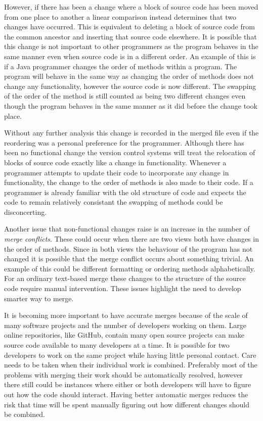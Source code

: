 However, if there has been a change where a block of source code has been moved from one place to another a linear comparison instead determines that two changes have occurred.  This is equivalent to deleting a block of source code from the common ancestor and inserting that source code elsewhere. It is possible that this change is not important to other programmers as the program behaves in the same manner even when source code is in a different order.  An example of this is if a Java programmer changes the order of methods within a program.  The program will behave in the same way as changing the order of methods does not change any functionality, however the source code is now different. The swapping of the order of the method is still counted as being two different changes even though the program behaves in the same manner as it did before the change took place.

Without any further analysis this change is recorded in the merged file even if the reordering was a personal preference for the programmer.  Although there has been no functional change the version control systems will treat the relocation of blocks of source code exactly like a change in functionality.  Whenever a programmer attempts to update their code to incorporate any change in functionality, the change to the order of methods is also made to their code.  If a programmer is already familiar with the old structure of code and expects the code to remain relatively consistant the swapping of methods could be disconcerting.

Another issue that non-functional changes raise is an increase in the number of \emph{merge conflicts}. These could occur when there are two views both have changes in the order of methods. Since in both views the behaviour of the program has not changed it is possible that the merge conflict occurs about something trivial. An example of this could be different formatting or ordering methods alphabetically. For an ordinary text-based merge these changes to the structure of the source code require manual intervention. These issues highlight the need to develop smarter way to merge.

It is becoming more important to have accurate merges because of the scale of many software projects and the number of developers working on them.  Large online repositories, like GitHub, contain many open source projects can make source code available to many developers at a time.  It is possible for two developers to work on the same project while having little personal contact. Care needs to be taken when their individual work is combined.  Preferably most of the problems with merging their work should be automatically resolved, however there still could be instances where either or both developers will have to figure out how the code should interact. Having better automatic merges reduces the risk that time will be spent manually figuring out how different changes should be combined.

